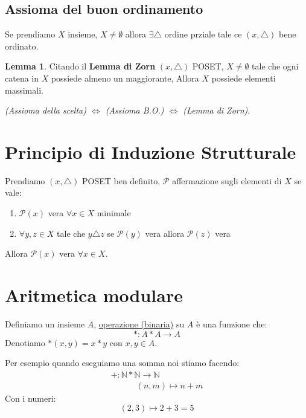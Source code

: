 \documentclass{article}
\theoremstyle{definition}
\newtheorem{lemma}{Lemma}[section]
\begin{document}
\subsection{Assioma del buon ordinamento}\label{Assioma_del_buon_ordinamento}
Se prendiamo $X$ insieme, $X \not = \emptyset$ allora $\exists \triangle$ ordine prziale tale ce $(x,\triangle)$ bene ordinato. \par

\begin{lemma}
Citando il \textbf{Lemma di Zorn} $(x, \triangle)$ POSET, $X \not = \emptyset$ tale che ogni catena in $X$ possiede almeno un maggiorante, Allora $X$ possiede elementi massimali. \par
\textit{(Assioma della scelta) $\Leftrightarrow$ (Assioma B.O.)  $\Leftrightarrow$ (Lemma di Zorn)}. \par
\end{lemma}





\newpage
\section{Principio di Induzione Strutturale}

Prendiamo $(x,\triangle)$ POSET ben definito, $\mathcal{P}$ affermazione sugli elementi di $X$ se vale:
\begin{enumerate}
        \item $\mathcal{P}(x)$ vera $\forall x \in X$ minimale
        \item $\forall y,z \in X $ tale che $y \triangle z$ se $\mathcal{P}(y)$ vera allora $\mathcal{P}(z)$ vera 
\end{enumerate}
Allora $\mathcal{P}(x)$ vera $\forall x \in X$.




\newpage
\section{Aritmetica modulare}

Definiamo un insieme $ A $, \underline{operazione (binaria)} su $ A $ è una funzione che:
\begin{equation*}
        * : A * A \to A
\end{equation*}
Denotiamo $*(x,y) = x*y$ con $ x,y \in A $. \par
Per esempio quando eseguiamo una somma noi stiamo facendo:
\begin{align*}
        + : \mathbb{N}*\mathbb{N} \to \mathbb{N} \\
        \quad \quad \quad (n,m) \mapsto n + m
\end{align*}
Con i numeri:
\begin{equation*}
        (2,3) \mapsto 2 + 3 = 5
\end{equation*}
\end{document}
